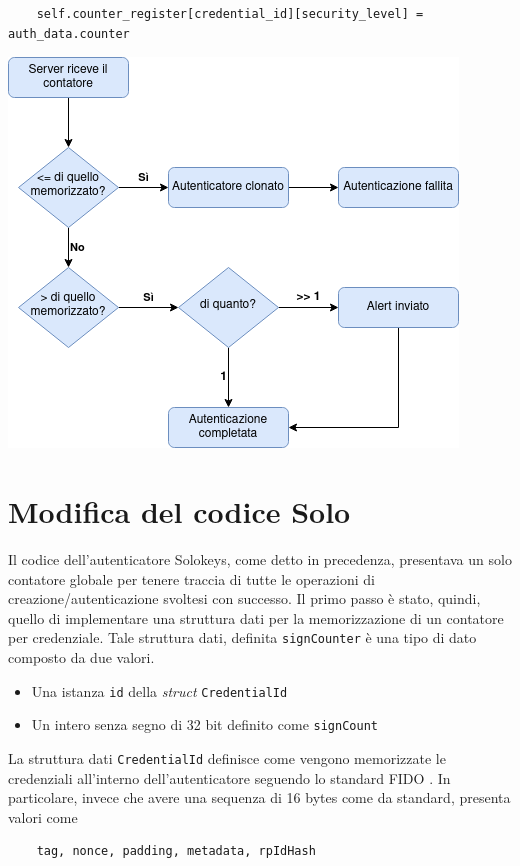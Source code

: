 \begin{verbatim}
	self.counter_register[credential_id][security_level] = auth_data.counter
\end{verbatim}

\begin{center}
	\includegraphics[width=.6\columnwidth]{figures/flowchart_contatore}
	\label{fig:contatore_webauthn}
\end{center}

\section{Modifica del codice Solo}
\label{modifica_solo}

Il codice dell'autenticatore Solokeys, come detto in precedenza, presentava un solo contatore globale per tenere traccia di tutte le operazioni di creazione/autenticazione svoltesi con successo. Il primo passo è stato, quindi, quello di implementare una struttura dati per la memorizzazione di un contatore per credenziale. Tale struttura dati, definita \verb*|signCounter| è una tipo di dato composto da due valori.
\begin{itemize}
	\item Una istanza \verb*|id| della \emph{struct} \verb*|CredentialId|
	\item Un intero senza segno di 32 bit definito come \verb*|signCount|
\end{itemize}

La struttura dati \verb*|CredentialId| definisce come vengono memorizzate le credenziali all'interno dell'autenticatore seguendo lo standard FIDO \cite{fido:credential_id}. In particolare, invece che avere una sequenza di 16 bytes come da standard, presenta valori come \begin{verbatim}
	tag, nonce, padding, metadata, rpIdHash
\end{verbatim} 

